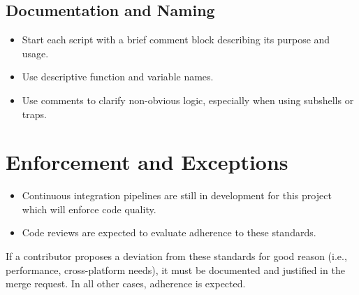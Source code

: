 \subsection{Documentation and Naming}
\begin{itemize}
    \item Start each script with a brief comment block describing its purpose and usage.
    \item Use descriptive function and variable names.
    \item Use comments to clarify non-obvious logic, especially when using subshells or traps.
\end{itemize}











\section{Enforcement and Exceptions}

\begin{itemize}
    \item Continuous integration pipelines are still in development for this project which will enforce code quality.
    \item Code reviews are expected to evaluate adherence to these standards.
\end{itemize}

If a contributor proposes a deviation from these standards for good reason (i.e., performance, cross-platform needs), it must be documented and justified in the merge request. In all other cases, adherence is expected.





